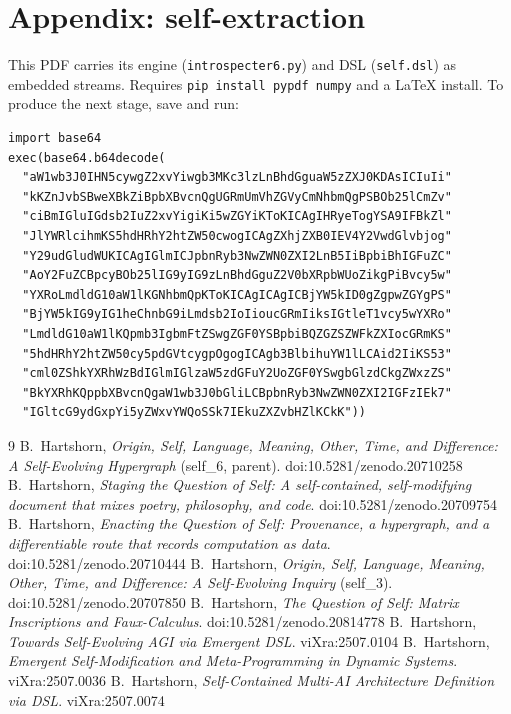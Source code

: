 \documentclass[11pt]{article}
\begin{document}
\section*{Appendix: self-extraction}
This PDF carries its engine (\texttt{introspecter6.py}) and DSL
(\texttt{self.dsl}) as embedded streams. Requires \texttt{pip install pypdf
numpy} and a LaTeX install. To produce the next stage, save and run:
\begin{Verbatim}[fontsize=\small,frame=single]
import base64
exec(base64.b64decode(
  "aW1wb3J0IHN5cywgZ2xvYiwgb3MKc3lzLnBhdGguaW5zZXJ0KDAsICIuIi"
  "kKZnJvbSBweXBkZiBpbXBvcnQgUGRmUmVhZGVyCmNhbmQgPSBOb25lCmZv"
  "ciBmIGluIGdsb2IuZ2xvYigiKi5wZGYiKToKICAgIHRyeTogYSA9IFBkZl"
  "JlYWRlcihmKS5hdHRhY2htZW50cwogICAgZXhjZXB0IEV4Y2VwdGlvbjog"
  "Y29udGludWUKICAgIGlmICJpbnRyb3NwZWN0ZXI2LnB5IiBpbiBhIGFuZC"
  "AoY2FuZCBpcyBOb25lIG9yIG9zLnBhdGguZ2V0bXRpbWUoZikgPiBvcy5w"
  "YXRoLmdldG10aW1lKGNhbmQpKToKICAgICAgICBjYW5kID0gZgpwZGYgPS"
  "BjYW5kIG9yIG1heChnbG9iLmdsb2IoIioucGRmIiksIGtleT1vcy5wYXRo"
  "LmdldG10aW1lKQpmb3IgbmFtZSwgZGF0YSBpbiBQZGZSZWFkZXIocGRmKS"
  "5hdHRhY2htZW50cy5pdGVtcygpOgogICAgb3BlbihuYW1lLCAid2IiKS53"
  "cml0ZShkYXRhWzBdIGlmIGlzaW5zdGFuY2UoZGF0YSwgbGlzdCkgZWxzZS"
  "BkYXRhKQppbXBvcnQgaW1wb3J0bGliLCBpbnRyb3NwZWN0ZXI2IGFzIEk7"
  "IGltcG9ydGxpYi5yZWxvYWQoSSk7IEkuZXZvbHZlKCkK"))
\end{Verbatim}
\begin{thebibliography}{9}
 B.~Hartshorn, \emph{Origin, Self, Language, Meaning, Other, Time,
and Difference: A Self-Evolving Hypergraph} (self\_6, parent).
doi:10.5281/zenodo.20710258
 B.~Hartshorn, \emph{Staging the Question of Self: A
self-contained, self-modifying document that mixes poetry, philosophy, and
code}. doi:10.5281/zenodo.20709754
 B.~Hartshorn, \emph{Enacting the Question of Self: Provenance,
a hypergraph, and a differentiable route that records computation as data}.
doi:10.5281/zenodo.20710444
 B.~Hartshorn, \emph{Origin, Self, Language, Meaning, Other, Time,
and Difference: A Self-Evolving Inquiry} (self\_3). doi:10.5281/zenodo.20707850
 B.~Hartshorn, \emph{The Question of Self: Matrix Inscriptions
and Faux-Calculus}. doi:10.5281/zenodo.20814778
 B.~Hartshorn, \emph{Towards Self-Evolving AGI via Emergent DSL}.
viXra:2507.0104
 B.~Hartshorn, \emph{Emergent Self-Modification and
Meta-Programming in Dynamic Systems}. viXra:2507.0036
 B.~Hartshorn, \emph{Self-Contained Multi-AI Architecture
Definition via DSL}. viXra:2507.0074
\end{thebibliography}
\end{document}
